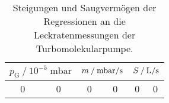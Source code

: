 \begin{table}
    \centering
    \caption{Steigungen und Saugvermögen der Regressionen an die Leckratenmessungen der Turbomolekularpumpe.}
    \label{tab:saug_leck_T}
    \begin{tabular}{S[table-format=1.1] @{${}\pm{}$} S
                    S[table-format=1.4] @{${}\pm{}$} S[table-format=1.4]
                    S @{${}\pm{}$} S}
    \toprule
         &
         &
         \\
    \midrule
    0 & 0 & 0 & 0 & 0 & 0 \\
    \end{tabular}
\end{table}
